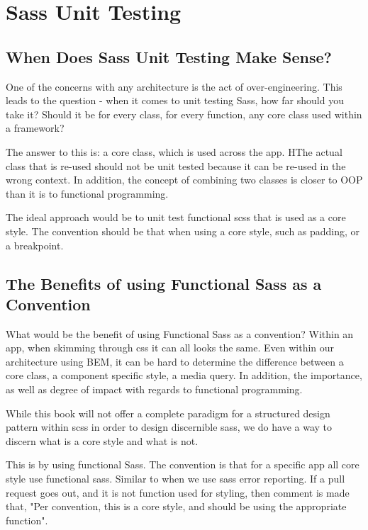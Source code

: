 \chapter{ Sass Unit Testing }

\section{ When Does Sass Unit Testing Make Sense? }
One of the concerns with any architecture is the act of over-engineering. This leads to the question - when it comes to unit testing Sass, how far should you take it?  Should it be for every class, for every function, any core class used within a framework?

The answer to this is: a core class, which is used across the app. HThe actual class that is re-used should not be unit tested because it can be re-used in the wrong context. In addition, the concept of combining two classes is closer to OOP than it is to functional programming.

The ideal approach would be to unit test functional scss that is used as a core style. The convention should be that when using a core style, such as padding, or a breakpoint.

\section{ The Benefits of using Functional Sass as a Convention }
What would be the benefit of using Functional Sass as a convention? Within an app, when skimming through css it can all looks the same. Even within our architecture using BEM, it can be hard to determine the difference between a core class, a component specific style, a media query. In addition, the importance, as well as degree of impact with regards to functional programming.

While this book will not offer a complete paradigm for a structured design pattern within scss in order to design discernible sass, we do have a way to discern what is a core style and what is not. 

This is by using functional Sass. The convention is that for a specific app all core style use functional sass. Similar to when we use sass error reporting. If a pull request goes out, and it is not function used for styling, then comment is made that, "Per convention, this is a core style, and should be using the appropriate function".

